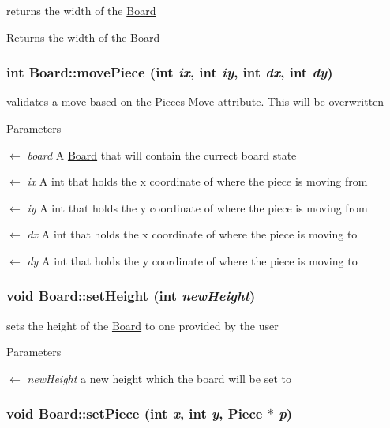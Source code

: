 returns the width of the \hyperlink{classBoard}{Board} \begin{DoxyReturn}{Returns}
the width of the \hyperlink{classBoard}{Board} 
\end{DoxyReturn}
\hypertarget{classBoard_a0f7aae004483872ecf3c1056ca961fef}{
\subsubsection[{movePiece}]{\setlength{\rightskip}{0pt plus 5cm}int Board::movePiece (int {\em ix}, \/  int {\em iy}, \/  int {\em dx}, \/  int {\em dy})}}
\label{classBoard_a0f7aae004483872ecf3c1056ca961fef}


validates a move based on the Pieces Move attribute. This will be overwritten 
\begin{DoxyParams}{Parameters}
\item[\mbox{$\leftarrow$} {\em board}]A \hyperlink{classBoard}{Board} that will contain the currect board state \item[\mbox{$\leftarrow$} {\em ix}]A int that holds the x coordinate of where the piece is moving from \item[\mbox{$\leftarrow$} {\em iy}]A int that holds the y coordinate of where the piece is moving from \item[\mbox{$\leftarrow$} {\em dx}]A int that holds the x coordinate of where the piece is moving to \item[\mbox{$\leftarrow$} {\em dy}]A int that holds the y coordinate of where the piece is moving to \end{DoxyParams}
\hypertarget{classBoard_a7f35e7488ab3d4a72ebb34c56e3b3ec2}{
\subsubsection[{setHeight}]{\setlength{\rightskip}{0pt plus 5cm}void Board::setHeight (int {\em newHeight})}}
\label{classBoard_a7f35e7488ab3d4a72ebb34c56e3b3ec2}


sets the height of the \hyperlink{classBoard}{Board} to one provided by the user 
\begin{DoxyParams}{Parameters}
\item[\mbox{$\leftarrow$} {\em newHeight}]a new height which the board will be set to \end{DoxyParams}
\hypertarget{classBoard_a4eca4cabd2a51a2095917b203fecbe0c}{
\subsubsection[{setPiece}]{\setlength{\rightskip}{0pt plus 5cm}void Board::setPiece (int {\em x}, \/  int {\em y}, \/  {\bf Piece} $\ast$ {\em p})}}
\label{classBoard_a4eca4cabd2a51a2095917b203fecbe0c}


